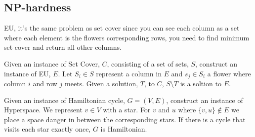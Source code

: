 \documentclass[a4paper]{article}
\newenvironment{task}[1]
{
	\begin{description}[align=right]
		\item [#1]
}{		%
	\end{description}
}
\DeclareMathOperator{\*}{\cdot}
\begin{document}
\begin{task}{10. (a)}
\end{task}

\begin{task}{(b)}
\end{task}

\begin{task}{(c)}
\end{task}

\subsection*{NP-hardness}

\begin{task}{11. (a)}
	 EU, it's the same problem as set cover since you can see each column as a set where each element is the flowers corresponding rows, you need to find minimum set cover and return all other columns.
\end{task}

\begin{task}{(b)}
\end{task}

\begin{task}{(c)}
\end{task}

\begin{task}{(d)}
\end{task}

\begin{task}{(e)}
\end{task}

\begin{task}{(f)}
	\qquad Given an instance of Set Cover, $C$, consisting of a set of sets, $S$, construct an instance of EU, $E$. Let $S_i\in S$ represent a column in $E$ and $s_j\in S_i$ a flower where column $i$ and row $j$ meets. Given a solution, $T$, to $C$, $S \setminus T$ is a soltion to $E$.
\end{task}




\begin{task}{100107 12. (f)}
	\qquad Given an instance of Hamiltonian cycle, $G=(V,E)$, construct an instance of Hyperspace. We represent $v\in V$ with a star. For $v$ and $u$ where $\{v,u\}\not\in E$ we place a space danger in between the corresponding stars. If there is a cycle that visits each star exactly once, $G$ is Hamiltonian.
\end{task}
\end{document}
